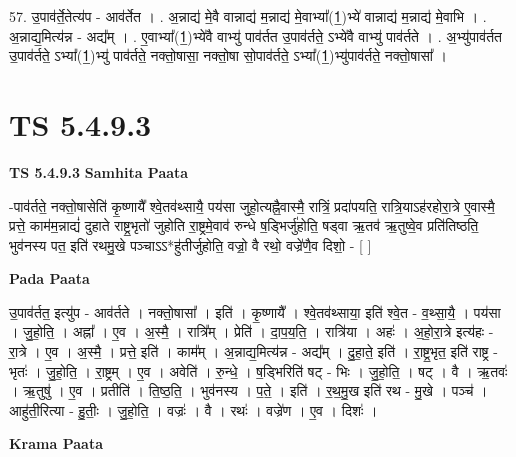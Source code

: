 \documentclass[17pt]{extarticle}
\begin{document}
57. उ॒पाव॑र्ते॒तेत्य॑प - आव॑र्तेत । . अ॒न्नाद्य॑ मे॒वै वान्नाद्य॑ म॒न्नाद्य॑ मे॒वाभ्या᳚(1॒)भ्ये॑ वान्नाद्य॑ म॒न्नाद्य॑ मे॒वाभि । . अ॒न्नाद्य॒मित्य॑न्न - अद्य᳚म् । . ए॒वाभ्या᳚(1॒)भ्ये॑वै वाभ्यु॑ पाव॑र्तत उ॒पाव॑र्तते॒ ऽभ्ये॑वै वाभ्यु॑ पाव॑र्तते । . अ॒भ्यु॑पाव॑र्तत उ॒पाव॑र्तते॒ ऽभ्या᳚(1॒)भ्यु॑ पाव॑र्तते॒ नक्तो॒षासा॒ नक्तो॒षा सो॒पाव॑र्तते॒ ऽभ्या᳚(1॒)भ्यु॑पाव॑र्तते॒ नक्तो॒षासा᳚ । \newline
\pagebreak
{}

\section{ TS 5.4.9.3 }

\textbf{TS 5.4.9.3 } \newline
\textbf{Samhita Paata} \newline

-पाव॑र्तते॒ नक्तो॒षासेति॑ कृ॒ष्णायै᳚ श्वे॒तव॑थ्सायै॒ पय॑सा जुहो॒त्यह्नै॒वास्मै॒ रात्रिं॒ प्रदा॑पयति॒ रात्रि॒याऽह॑रहोरा॒त्रे ए॒वास्मै॒ प्रत्ते॒ काम॑म॒न्नाद्यं॑ दुहाते राष्ट्र॒भृतो॑ जुहोति रा॒ष्ट्रमे॒वाव॑ रुन्धे ष॒ड्भिर्जु॑होति॒ षड्वा ऋ॒तव॑ ऋ॒तुष्वे॒व प्रति॑तिष्ठति॒ भुव॑नस्य पत॒ इति॑ रथमु॒खे पञ्चाऽऽ*हु॑तीर्जुहोति॒ वज्रो॒ वै रथो॒ वज्रे॑णै॒व दिशो॒ - [  ] \newline

\textbf{Pada Paata} \newline

उ॒पाव॑र्तत॒ इत्यु॑प - आव॑र्तते । नक्तो॒षासा᳚ । इति॑ । कृ॒ष्णायै᳚ । श्वे॒तव॑थ्साया॒ इति॑ श्वे॒त - व॒थ्सा॒यै॒ । पय॑सा । जु॒हो॒ति॒ । अह्ना᳚ । ए॒व । अ॒स्मै॒ । रात्रि᳚म् । प्रेति॑ । दा॒प॒य॒ति॒ । रात्रि॑या । अहः॑ । अ॒हो॒रा॒त्रे इत्य॑हः - रा॒त्रे । ए॒व । अ॒स्मै॒ । प्रत्ते॒ इति॑ । काम᳚म् । अ॒न्नाद्य॒मित्य॑न्न - अद्य᳚म् । दु॒हा॒ते॒ इति॑ । रा॒ष्ट्र॒भृत॒ इति॑ राष्ट्र - भृतः॑ । जु॒हो॒ति॒ । रा॒ष्ट्रम् । ए॒व । अवेति॑ । रु॒न्धे॒ । ष॒ड्भिरिति॑ षट् - भिः । जु॒हो॒ति॒ । षट् । वै । ऋ॒तवः॑ । ऋ॒तुषु॑ । ए॒व । प्रतीति॑ । ति॒ष्ठ॒ति॒ । भुव॑नस्य । प॒ते॒ । इति॑ । र॒थ॒मु॒ख इति॑ रथ - मु॒खे । पञ्च॑ । आहु॑ती॒रित्या - हु॒तीः॒ । जु॒हो॒ति॒ । वज्रः॑ । वै । रथः॑ । वज्रे॑ण । ए॒व । दिशः॑ ।  \newline


\textbf{Krama Paata} \newline
\end{document}
